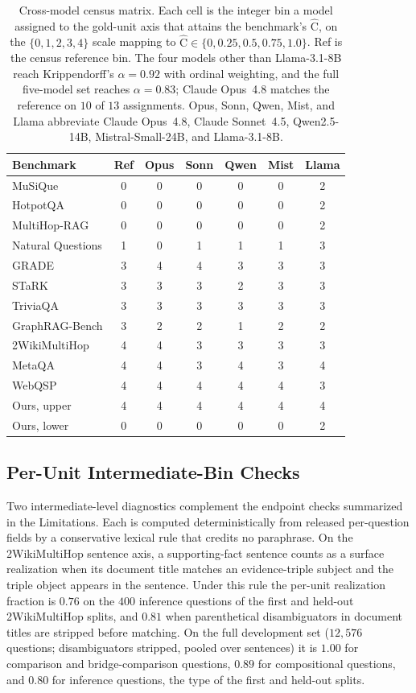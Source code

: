 \documentclass[11pt]{article}
\newcommand{\Chat}{\widehat{\mathrm{C}}}
\begin{document}
\begin{table}[ht]\centering\small
\setlength{\tabcolsep}{2.5pt}
\begin{tabular}{lcccccc}
\toprule
Benchmark & Ref & Opus & Sonn & Qwen & Mist & Llama\\
\midrule
MuSiQue & 0 & 0 & 0 & 0 & 0 & 2\\
HotpotQA & 0 & 0 & 0 & 0 & 0 & 2\\
MultiHop-RAG & 0 & 0 & 0 & 0 & 0 & 2\\
Natural Questions & 1 & 0 & 1 & 1 & 1 & 3\\
GRADE & 3 & 4 & 4 & 3 & 3 & 3\\
STaRK & 3 & 3 & 3 & 2 & 3 & 3\\
TriviaQA & 3 & 3 & 3 & 3 & 3 & 3\\
GraphRAG-Bench & 3 & 2 & 2 & 1 & 2 & 2\\
2WikiMultiHop & 4 & 4 & 3 & 3 & 3 & 3\\
MetaQA & 4 & 4 & 3 & 4 & 3 & 4\\
WebQSP & 4 & 4 & 4 & 4 & 4 & 3\\
Ours, upper & 4 & 4 & 4 & 4 & 4 & 4\\
Ours, lower & 0 & 0 & 0 & 0 & 0 & 2\\
\bottomrule
\end{tabular}
\caption{Cross-model census matrix. Each cell is the integer bin a model assigned to the gold-unit axis that attains the benchmark's $\Chat$, on the $\{0,1,2,3,4\}$ scale mapping to $\Chat\in\{0,0.25,0.5,0.75,1.0\}$. Ref is the census reference bin. The four models other than Llama-3.1-8B reach Krippendorff's $\alpha=0.92$ with ordinal weighting, and the full five-model set reaches $\alpha=0.83$; Claude Opus~4.8 matches the reference on $10$ of $13$ assignments. Opus, Sonn, Qwen, Mist, and Llama abbreviate Claude Opus~4.8, Claude Sonnet~4.5, Qwen2.5-14B, Mistral-Small-24B, and Llama-3.1-8B.}
\label{tab:crossmodel}
\end{table}

\subsection{Per-Unit Intermediate-Bin Checks}
\label{app:perunit}
Two intermediate-level diagnostics complement the endpoint checks summarized in the Limitations. Each is computed deterministically from released per-question fields by a conservative lexical rule that credits no paraphrase. On the 2WikiMultiHop sentence axis, a supporting-fact sentence counts as a surface realization when its document title matches an evidence-triple subject and the triple object appears in the sentence. Under this rule the per-unit realization fraction is $0.76$ on the $400$ inference questions of the first and held-out 2WikiMultiHop splits, and $0.81$ when parenthetical disambiguators in document titles are stripped before matching. On the full development set ($12{,}576$ questions; disambiguators stripped, pooled over sentences) it is $1.00$ for comparison and bridge-comparison questions, $0.89$ for compositional questions, and $0.80$ for inference questions, the type of the first and held-out splits.
\end{document}
